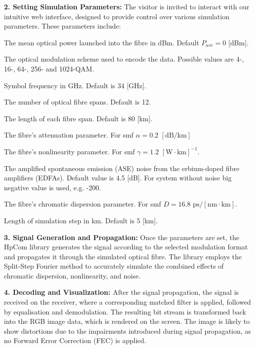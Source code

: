 \textbf{2. Setting Simulation Parameters:} The visitor is invited to interact with our intuitive web interface, designed to provide control over various simulation parameters. These parameters include:
\begin{description}[style=multiline, leftmargin=4cm, font=\normalfont]
    \item[\texttt{Average power}] The mean optical power launched into the fibre in dBm. Default $P_{ave}=0$ \textrm{[dBm]}.
    \item[\texttt{Modulation format}] The optical modulation scheme used to encode the data. Possible values are 4-, 16-, 64-, 256- and 1024-QAM.
    \item[\texttt{Symbol frequency}] Symbol frequency in GHz. Default is 34 \textrm{[GHz]}.
    \item[\texttt{Number of spans}] The number of optical fibre spans. Default is 12.
    \item[\texttt{Length of spans}] The length of each fibre span. Default is 80 \textrm{[km]}.
    \item[\texttt{Attenuation}] The fibre's attenuation parameter. For \gls{smf} $\alpha = 0.2$ $[\textrm{dB}/\textrm{km}]$
    \item[\texttt{Nonlinearity}] The fibre's nonlinearity parameter. For \gls{smf} $\gamma = 1.2$ $[\textrm{W} \cdot \textrm{km}]^{-1}$.
    \item[\texttt{Noise}] The amplified spontaneous emission (ASE) noise from the erbium-doped fibre amplifiers (EDFAs). Default value is 4.5 \textrm{[dB]}. For system without noise big negative value is used, e.g. -200.
    \item[\texttt{Dispersion}] The fibre's chromatic dispersion parameter. For \gls{smf} $D = 16.8$ $\textrm{ps}/[\textrm{nm} \cdot \textrm{km}]$.
    \item[\texttt{Simulation step}] Length of simulation step in km. Default is 5 \textrm{[km]}.
\end{description}


\textbf{3. Signal Generation and Propagation:} Once the parameters are set, the HpCom library generates the signal according to the selected modulation format and propagates it through the simulated optical fibre. The library employs the Split-Step Fourier method to accurately simulate the combined effects of chromatic dispersion, nonlinearity, and noise. 



\textbf{4. Decoding and Visualization:} After the signal propagation, the signal is received on the receiver, where a corresponding matched filter is applied, followed by equalisation and demodulation. The resulting bit stream is transformed back into the RGB image data, which is rendered on the screen. The image is likely to show distortions due to the impairments introduced during signal propagation, as no Forward Error Correction (FEC) is applied.

